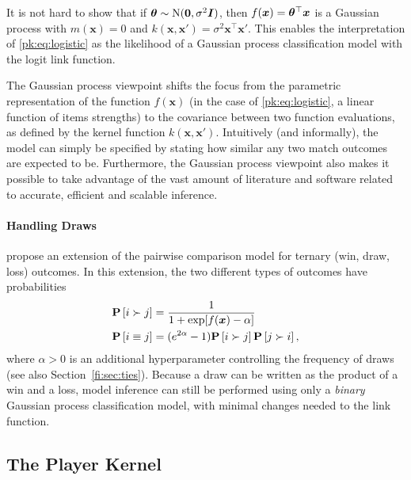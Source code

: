 It is not hard to show that if $\bm{\theta} \sim \mathrm{N}( \bm{0}, \sigma^2 \bm{I} )$, then $f(\bm{x}) = \bm{\theta}^\top \bm{x}$ is a Gaussian process with $m(\bm{x}) = 0$ and $k(\bm{x}, \bm{x}') = \sigma^2 \bm{x}^\top \bm{x}'$.
This enables the interpretation of \eqref{pk:eq:logistic} as the likelihood of a Gaussian process classification model with the logit link function.

The Gaussian process viewpoint shifts the focus from the parametric representation of the function $f(\bm{x})$ (in the case of \eqref{pk:eq:logistic}, a linear function of items strengths) to the covariance between two function evaluations, as defined by the kernel function $k(\bm{x}, \bm{x}')$.
Intuitively (and informally), the model can simply be specified by stating how similar any two match outcomes are expected to be.
Furthermore, the Gaussian process viewpoint also makes it possible to take advantage of the vast amount of literature and software related to accurate, efficient and scalable inference.


\paragraph{Handling Draws}
\citet{rao1967ties} propose an extension of the pairwise comparison model for ternary (win, draw, loss) outcomes.
In this extension, the two different types of outcomes have probabilities
\begin{align*}
\mathbf{P}\left[ i \succ j \right]  &= \frac{1}{1 + \exp[f(\bm{x}) - \alpha]} \\
\mathbf{P}\left[ i \equiv j \right] &= (e^{2 \alpha} - 1) \mathbf{P}\left[ i \succ j \right] \mathbf{P}\left[ j \succ i \right],
\end{align*}
where $\alpha > 0$ is an additional hyperparameter controlling the frequency of draws (see also Section~\ref{fi:sec:ties}).
Because a draw can be written as the product of a win and a loss, model inference can still be performed using only a \emph{binary} Gaussian process classification model, with minimal changes needed to the link function.


\subsection{The Player Kernel}

